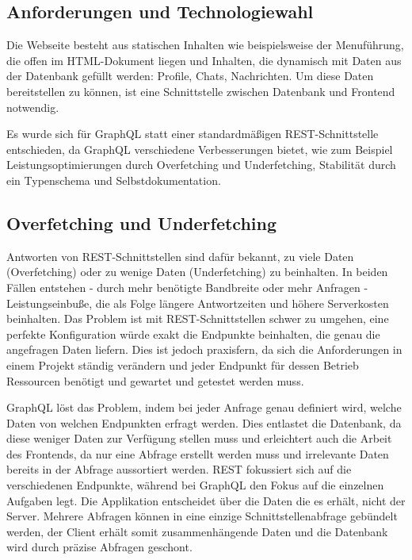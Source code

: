 \subsection{Anforderungen und Technologiewahl}
Die Webseite besteht aus statischen Inhalten wie beispielsweise der Menuführung, die offen im HTML-Dokument liegen und Inhalten, die dynamisch mit Daten aus der Datenbank gefüllt werden: Profile, Chats, Nachrichten. Um diese Daten bereitstellen zu können, ist eine Schnittstelle zwischen Datenbank und Frontend notwendig. 

Es wurde sich für GraphQL statt einer standardmäßigen REST-Schnittstelle entschieden, da GraphQL verschiedene Verbesserungen bietet, wie zum Beispiel Leistungsoptimierungen durch Overfetching und Underfetching, Stabilität durch ein Typenschema und Selbstdokumentation.

\subsection{Overfetching und Underfetching}
Antworten von REST-Schnittstellen sind dafür bekannt, zu viele Daten (Overfetching) oder zu wenige Daten (Underfetching) zu beinhalten.
In beiden Fällen entstehen - durch mehr benötigte Bandbreite oder mehr Anfragen - Leistungseinbuße, die als Folge längere Antwortzeiten und höhere Serverkosten beinhalten.
Das Problem ist mit REST-Schnittstellen schwer zu umgehen, eine perfekte Konfiguration würde exakt die Endpunkte beinhalten, die genau die angefragen Daten liefern. Dies ist jedoch praxisfern, da sich die Anforderungen in einem Projekt ständig verändern und jeder Endpunkt für dessen Betrieb Ressourcen benötigt und gewartet und getestet werden muss.

GraphQL löst das Problem, indem bei jeder Anfrage genau definiert wird, welche Daten von welchen Endpunkten erfragt werden. Dies entlastet die Datenbank, da diese weniger Daten zur Verfügung stellen muss und erleichtert auch die Arbeit des Frontends, da nur eine Abfrage erstellt werden muss und irrelevante Daten bereits in der Abfrage aussortiert werden. REST fokussiert sich auf die verschiedenen Endpunkte, während bei GraphQL den Fokus auf die einzelnen Aufgaben legt. Die Applikation entscheidet über die Daten die es erhält, nicht der Server.
Mehrere Abfragen können in eine einzige Schnittstellenabfrage gebündelt werden, der Client erhält somit zusammenhängende Daten und die Datenbank wird durch präzise Abfragen geschont.

